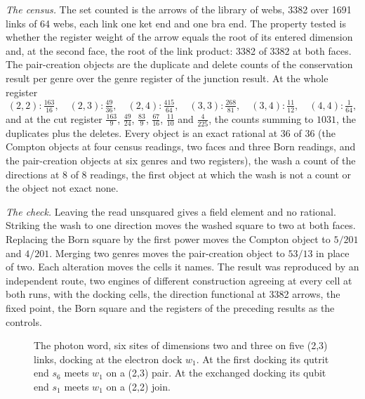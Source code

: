 \begin{chproof}
\textit{The census.} The set counted is the arrows of the library of webs, 3382 over 1691 links of 64 webs, each link one ket end and one bra end. The property tested is whether the register weight of the arrow equals the root of its entered dimension and, at the second face, the root of the link product: 3382 of 3382 at both faces. The pair-creation objects are the duplicate and delete counts of the conservation result per genre over the genre register of the junction result. At the whole register
\begin{equation}
(2,2):\tfrac{163}{16},\quad (2,3):\tfrac{49}{36},\quad (2,4):\tfrac{415}{64},\quad (3,3):\tfrac{268}{81},\quad (3,4):\tfrac{11}{12},\quad (4,4):\tfrac{1}{64},
\end{equation}
and at the cut register $\tfrac{163}{9}$, $\tfrac{49}{24}$, $\tfrac{83}{9}$, $\tfrac{67}{16}$, $\tfrac{11}{10}$ and $\tfrac{4}{225}$, the counts summing to $1031$, the duplicates plus the deletes. Every object is an exact rational at 36 of 36 (the Compton objects at four census readings, two faces and three Born readings, and the pair-creation objects at six genres and two registers), the wash a count of the directions at 8 of 8 readings, the first object at which the wash is not a count or the object not exact none.

\textit{The check.} Leaving the read unsquared gives a field element and no rational. Striking the wash to one direction moves the washed square to two at both faces. Replacing the Born square by the first power moves the Compton object to $5/201$ and $4/201$. Merging two genres moves the pair-creation object to $53/13$ in place of two. Each alteration moves the cells it names. The result was reproduced by an independent route, two engines of different construction agreeing at every cell at both runs, with the docking cells, the direction functional at 3382 arrows, the fixed point, the Born square and the registers of the preceding results as the controls.
\end{chproof}
\begin{figure}[h]
\centering
{}
\caption{The photon word, six sites of dimensions two and three on five (2,3) links, docking at the electron dock $w_1$. At the first docking its qutrit end $s_6$ meets $w_1$ on a (2,3) pair. At the exchanged docking its qubit end $s_1$ meets $w_1$ on a (2,2) join.}
\end{figure}
